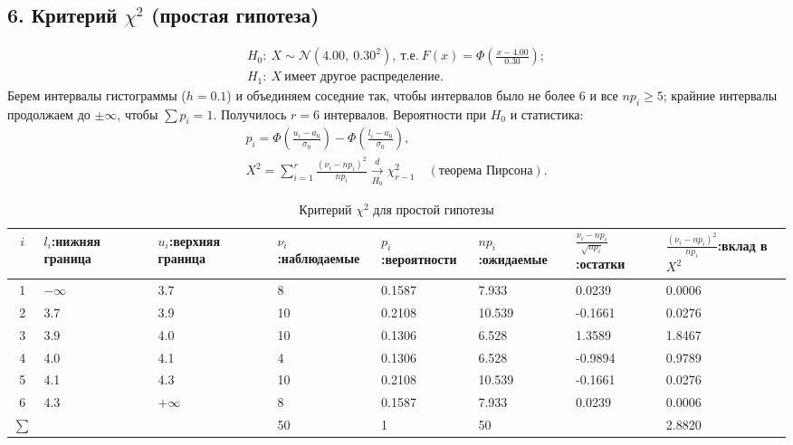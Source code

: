 \documentclass[12pt]{spbstu-task}
\begin{document}
\subsection*{6. Критерий \(\chi^2\) (простая гипотеза)}
\begin{gather*}
  H_0:\ X \sim \mathcal{N}(4.00,\ 0.30^2),\ \text{т.е.}\ F(x) = \Phi\left(\frac{x - 4.00}{0.30}\right);\\
  H_1:\ X\ \text{имеет другое распределение}.
\end{gather*}
Берем интервалы гистограммы (\(h = 0.1\)) и объединяем соседние так, чтобы интервалов было не более 6
и все \(np_i \ge 5\); крайние интервалы продолжаем до \(\pm\infty\), чтобы \(\sum p_i = 1\).
Получилось \(r = 6\) интервалов. Вероятности при \(H_0\) и статистика:
\begin{gather*}
  p_i = \Phi\left(\frac{u_i - a_0}{\sigma_0}\right) - \Phi\left(\frac{l_i - a_0}{\sigma_0}\right),\\
  X^2 = \sum_{i=1}^{r}\frac{(\nu_i - np_i)^2}{np_i} \xrightarrow[H_0]{d} \chi^2_{r - 1}\quad(\text{теорема Пирсона}).
\end{gather*}

\begin{table}[H]
  \caption{Критерий \(\chi^2\) для простой гипотезы}
  \centering
  \small
  \setlength{\tabcolsep}{2pt}
  \begin{tabularx}{\textwidth}{c*{7}{Y}}
    \toprule
    \(i\) & \(l_i\):\newline нижняя граница & \(u_i\):\newline верхняя граница & \(\nu_i\):\newline наблюдаемые
    & \(p_i\):\newline вероятности & \(np_i\):\newline ожидаемые
    & \(\frac{\nu_i - np_i}{\sqrt{np_i}}\):\newline остатки & \(\frac{(\nu_i - np_i)^2}{np_i}\):\newline вклад в \(X^2\) \\
     & \(-\infty\) & 3.7 & 8 & 0.1587 & 7.933 & 0.0239 & 0.0006 \\
    2 & 3.7 & 3.9 & 10 & 0.2108 & 10.539 & -0.1661 & 0.0276 \\
    3 & 3.9 & 4.0 & 10 & 0.1306 & 6.528 & 1.3589 & 1.8467 \\
    4 & 4.0 & 4.1 & 4 & 0.1306 & 6.528 & -0.9894 & 0.9789 \\
    5 & 4.1 & 4.3 & 10 & 0.2108 & 10.539 & -0.1661 & 0.0276 \\
    6 & 4.3 & \(+\infty\) & 8 & 0.1587 & 7.933 & 0.0239 & 0.0006 \\
    \midrule
    \(\sum\) & & & 50 & 1 & 50 & & 2.8820 \\
    \bottomrule
  \end{tabularx}
\end{table}
\end{document}

